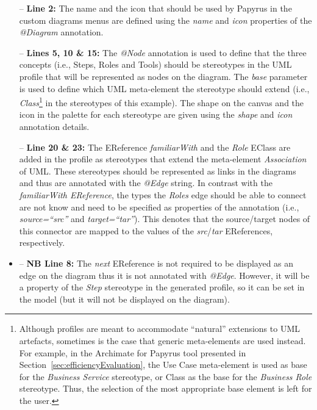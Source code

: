 \begin{itemize}
	\item[--] \textbf{Line 2:} The name and the icon that should be used by Papyrus in the custom diagrams menus are defined using the \textit{name} and \textit{icon} properties of the \textit{@Diagram} annotation.
	\item[--] \textbf{Lines 5, 10 \& 15:} The \textit{@Node} annotation is used to define that the three concepts (i.e., Steps, Roles and Tools) should be stereotypes in the UML profile that will be represented as nodes on the diagram. The \textit{base} parameter is used to define which UML meta-element the stereotype should extend (i.e., \textit{Class}\footnote{Although profiles are meant to accommodate ``natural'' extensions to UML artefacts, sometimes is the case that generic meta-elements are used instead. For example, in the Archimate for Papyrus tool presented in Section~\ref{sec:efficiencyEvaluation}, the Use Case meta-element is used as base for the \textit{Business Service} stereotype, or Class as the base for the \textit{Business Role} stereotype. Thus, the selection of the most appropriate base element is left for the user.} in the stereotypes of this example). The shape on the canvas and the icon in the palette for each stereotype are given using the \textit{shape} and \textit{icon} annotation details.
	\item[--] \textbf{Line 20 \& 23:} The EReference \textit{familiarWith} and the \textit{Role} EClass are added in the profile as stereotypes that extend the meta-element \textit{Association} of UML. These stereotypes should be represented as links in the diagrams and thus are annotated with the \textit{@Edge} string.
	In contrast with the \textit{familiarWith EReference}, the types the 
	\textit{Roles} edge should be able to connect are not know and need to be 
	specified as properties of the annotation (i.e., \textit{source=``src''} 
	and \textit{target=``tar''}). This denotes that the source/target nodes of 
	this connector are mapped to the values of the \textit{src}/\textit{tar} 
	EReferences, respectively.
	\item{--} \textbf{NB Line 8:} The \textit{next} EReference is not required 
	to be displayed as an edge on the diagram thus it is not annotated with 
	\emph{@Edge}. However, it will be a property of the \textit{Step} 
	stereotype in the generated profile, so it can be set in the model (but it 
	will not be displayed on the diagram).
\end{itemize}


